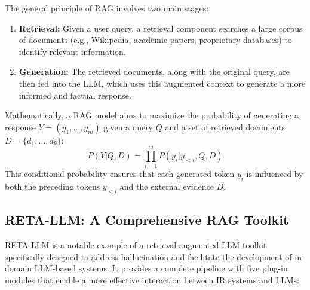 \documentclass{article}
\begin{document}
The general principle of RAG involves two main stages:
\begin{enumerate}
    \item \textbf{Retrieval:} Given a user query, a retrieval component searches a large corpus of documents (e.g., Wikipedia, academic papers, proprietary databases) to identify relevant information.
    \item \textbf{Generation:} The retrieved documents, along with the original query, are then fed into the LLM, which uses this augmented context to generate a more informed and factual response.
\end{enumerate}
Mathematically, a RAG model aims to maximize the probability of generating a response $Y = (y_1, \dots, y_m)$ given a query $Q$ and a set of retrieved documents $D = \{d_1, \dots, d_k\}$:
$$ P(Y | Q, D) = \prod_{i=1}^{m} P(y_i | y_{<i}, Q, D) $$
This conditional probability ensures that each generated token $y_i$ is influenced by both the preceding tokens $y_{<i}$ and the external evidence $D$.

\subsection{RETA-LLM: A Comprehensive RAG Toolkit}
RETA-LLM \cite{liu2023reta} is a notable example of a retrieval-augmented LLM toolkit specifically designed to address hallucination and facilitate the development of in-domain LLM-based systems. It provides a complete pipeline with five plug-in modules that enable a more effective interaction between IR systems and LLMs:
\end{document}
